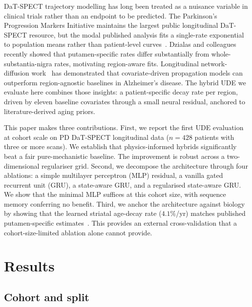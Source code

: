 DaT-SPECT trajectory modelling has long been treated as a nuisance variable in clinical trials rather than an endpoint to be predicted. The Parkinson's Progression Markers Initiative maintains the largest public longitudinal DaT-SPECT resource, but the modal published analysis fits a single-rate exponential to population means rather than patient-level curves~\cite{brumm2023milestone}. Dzialas and colleagues~\cite{dzialas2025dat} recently showed that putamen-specific rates differ substantially from whole-substantia-nigra rates, motivating region-aware fits. Longitudinal network-diffusion work~\cite{raj2015network} has demonstrated that covariate-driven propagation models can outperform region-agnostic baselines in Alzheimer's disease. The hybrid UDE we evaluate here combines those insights: a patient-specific decay rate per region, driven by eleven baseline covariates through a small neural residual, anchored to literature-derived aging priors.

This paper makes three contributions. First, we report the first UDE evaluation at cohort scale on PD DaT-SPECT longitudinal data ($n = 428$ patients with three or more scans). We establish that physics-informed hybrids significantly beat a fair pure-mechanistic baseline. The improvement is robust across a two-dimensional regulariser grid. Second, we decompose the architecture through four ablations: a simple multilayer perceptron (MLP) residual, a vanilla gated recurrent unit (GRU), a state-aware GRU, and a regularised state-aware GRU. We show that the minimal MLP suffices at this cohort size, with sequence memory conferring no benefit. Third, we anchor the architecture against biology by showing that the learned striatal age-decay rate ($4.1\%$/yr) matches published putamen-specific estimates~\cite{dzialas2025dat, nandhagopal2009}. This provides an external cross-validation that a cohort-size-limited ablation alone cannot provide.

\section{Results}

\subsection{Cohort and split}

